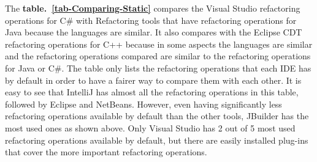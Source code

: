 The {\bf table.~\ref{tab-Comparing-Static}} compares the Visual Studio refactoring operations for C\# with Refactoring tools that have refactoring operations for Java because the languages are similar. It also compares with the Eclipse CDT  refactoring operations for C++ because in some aspects the languages are similar and the refactoring operations compared are similar to the refactoring operations for Java or C\#. 
The table only lists the refactoring operations that each IDE has by default in order to have a fairer way to compare them with each other.
It is easy to see that IntelliJ has almost all the refactoring operations in this table, followed by Eclipse and NetBeans.
However, even having significantly less refactoring operations available by default than the other tools, JBuilder has the most used ones as shown above.
Only Visual Studio has 2 out of 5 most used refactoring operations available by default, but there are easily installed plug-ins that cover the more important refactoring operations. 

